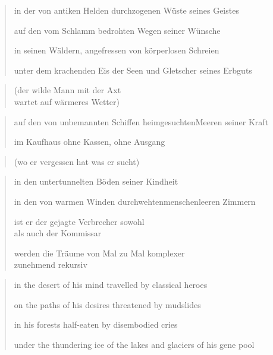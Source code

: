 
{\setlength{\vleftmargin}{0pt}\setlength{\stanzaskip}{0.7em}

\cleartoverso


\begin{verse}
in der von antiken Helden durchzogenen Wüste seines Geistes

auf den vom Schlamm bedrohten Wegen seiner Wünsche

in seinen Wäldern, angefressen von körperlosen Schreien

unter dem krachenden Eis der Seen und Gletscher seines Erbguts
\end{verse}

\begin{quote}
(der wilde Mann mit der Axt\\
wartet auf wärmeres Wetter)
\end{quote}

\begin{verse}
auf den von unbemannten Schiffen heimgesuchten\verselinebreak Meeren seiner Kraft

im Kaufhaus ohne Kassen, ohne Ausgang
\end{verse}

\begin{quote}
(wo er vergessen hat was er sucht)
\end{quote}

\begin{verse}
in den untertunnelten Böden seiner Kindheit

in den von warmen Winden durchwehten\verselinebreak menschenleeren Zimmern

ist er der gejagte Verbrecher sowohl\\
als auch der Kommissar

werden die Träume von Mal zu Mal komplexer\\
zunehmend rekursiv
\end{verse}

\clearpage


\begin{verse}
in the desert of his mind travelled by classical heroes

on the paths of his desires threatened by mudslides

in his forests half-eaten by disembodied cries

under the thundering ice of the lakes and glaciers of his gene pool
\end{verse}

}
